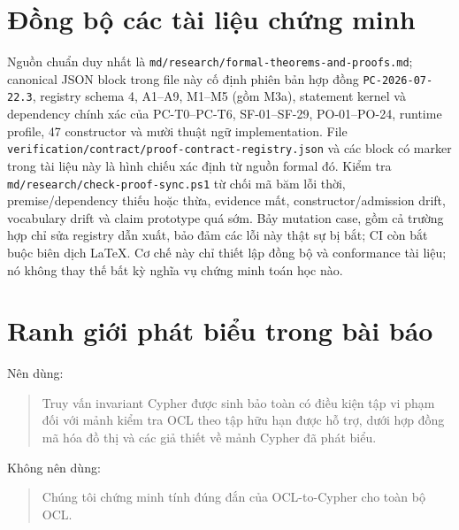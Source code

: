 \documentclass[11pt,a4paper]{article}
\theoremstyle{definition}
\begin{document}
\section{Đồng bộ các tài liệu chứng minh}

Nguồn chuẩn duy nhất là
\texttt{md/research/formal-theorems-and-proofs.md}; canonical JSON block trong
file này cố định phiên bản hợp
đồng \texttt{PC-2026-07-22.3}, registry schema 4, A1--A9, M1--M5 (gồm M3a), statement
kernel và dependency chính xác của PC-T0--PC-T6, SF-01--SF-29, PO-01--PO-24,
runtime profile, 47 constructor và mười thuật ngữ implementation. File
\texttt{verification/contract/proof-contract-registry.json} và các block có
marker trong tài liệu này là hình chiếu xác định từ nguồn formal đó.
Kiểm tra \texttt{md/research/check-proof-sync.ps1} từ chối mã băm lỗi thời,
premise/dependency thiếu hoặc thừa, evidence mất, constructor/admission drift,
vocabulary drift và claim prototype quá sớm. Bảy mutation case, gồm cả trường
hợp chỉ sửa registry dẫn xuất, bảo đảm các lỗi này thật sự bị bắt; CI còn bắt
buộc biên dịch LaTeX. Cơ chế này chỉ thiết lập
đồng bộ và conformance tài liệu; nó không thay thế bất kỳ nghĩa vụ chứng minh
toán học nào.

\section{Ranh giới phát biểu trong bài báo}

Nên dùng:
\begin{quote}
Truy vấn invariant Cypher được sinh bảo toàn có điều kiện tập vi phạm đối với
mảnh kiểm tra OCL theo tập hữu hạn được hỗ trợ, dưới hợp đồng mã hóa đồ thị và
các giả thiết về mảnh Cypher đã phát biểu.
\end{quote}

Không nên dùng:
\begin{quote}
Chúng tôi chứng minh tính đúng đắn của OCL-to-Cypher cho toàn bộ OCL.
\end{quote}
\end{document}
